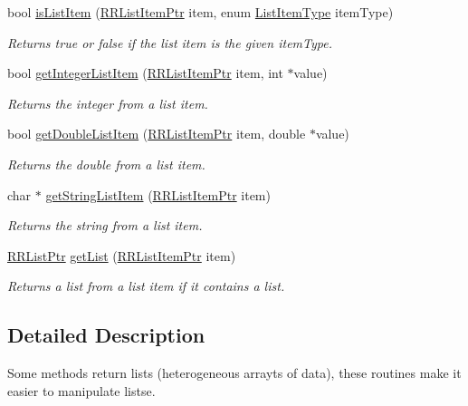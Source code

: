 \begin{DoxyCompactItemize}
bool \hyperlink{group__list_ga8b204dac55a44f35cc1904d5e0972db6}{is\-List\-Item} (\hyperlink{rrc__types_8h_a79938364b69256c42480bb3a29ebf73e}{R\-R\-List\-Item\-Ptr} item, enum \hyperlink{rrc__types_8h_ab99437ab2e88aa90b7ebb8add042b25e}{List\-Item\-Type} item\-Type)
\begin{DoxyCompactList}\small\item\em Returns true or false if the list item is the given item\-Type. \end{DoxyCompactList}\item 
bool \hyperlink{group__list_ga39de89e96a475dc43b7d6653c1b16bb2}{get\-Integer\-List\-Item} (\hyperlink{rrc__types_8h_a79938364b69256c42480bb3a29ebf73e}{R\-R\-List\-Item\-Ptr} item, int $\ast$value)
\begin{DoxyCompactList}\small\item\em Returns the integer from a list item. \end{DoxyCompactList}\item 
bool \hyperlink{group__list_ga70b6de5a951d9fc8f2fff4e725cc2ad8}{get\-Double\-List\-Item} (\hyperlink{rrc__types_8h_a79938364b69256c42480bb3a29ebf73e}{R\-R\-List\-Item\-Ptr} item, double $\ast$value)
\begin{DoxyCompactList}\small\item\em Returns the double from a list item. \end{DoxyCompactList}\item 
char $\ast$ \hyperlink{group__list_ga0af9b5f54fcb61b43650cc756d5d8773}{get\-String\-List\-Item} (\hyperlink{rrc__types_8h_a79938364b69256c42480bb3a29ebf73e}{R\-R\-List\-Item\-Ptr} item)
\begin{DoxyCompactList}\small\item\em Returns the string from a list item. \end{DoxyCompactList}\item 
\hyperlink{rrc__types_8h_a32a8a60ac06858ff3a791672bd2bec73}{R\-R\-List\-Ptr} \hyperlink{group__list_ga062c416b761b13200f28830cf64e3b6c}{get\-List} (\hyperlink{rrc__types_8h_a79938364b69256c42480bb3a29ebf73e}{R\-R\-List\-Item\-Ptr} item)
\begin{DoxyCompactList}\small\item\em Returns a list from a list item if it contains a list. \end{DoxyCompactList}\end{DoxyCompactItemize}


\subsection{Detailed Description}
Some methods return lists (heterogeneous arrayts of data), these routines make it easier to manipulate listse. 

